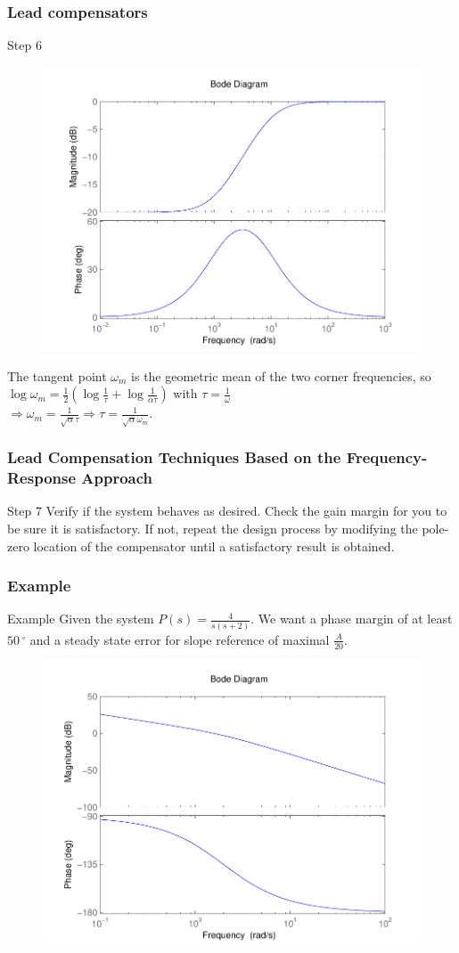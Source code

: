 \begin{frame}
	\frametitle{Lead compensators}
	\begin{block}{Step 6}
		\begin{figure}
			\centering
			\includegraphics[width=0.5
			\linewidth]{bodelead}
		\end{figure}
		The tangent point $\omega_m$ is the geometric mean of the two corner frequencies, so
		$ \log \omega_m = \frac{1}{2}(\log \frac{1}{\tau} + \log \frac{1}{\alpha\tau})$ with $\tau = \frac{1}{\omega}$
		\\ $\Rightarrow \omega_m = \frac{1}{\sqrt{\alpha}\tau} \Rightarrow \tau = \frac{1}{\sqrt{\alpha}\omega_m}$. 
	\end{block}
\end{frame}

\begin{frame}
	\frametitle{Lead Compensation Techniques Based on the Frequency-Response Approach}
	\begin{block}{Step 7}
		Verify if the system behaves as desired.
		Check the gain margin for you to be sure it is satisfactory. If not, repeat the design process
		by modifying the pole-zero location of the compensator until a satisfactory result
		is obtained.
	\end{block}
\end{frame}

\begin{frame}
\frametitle{Example}
\begin{block}{Example}
	Given the system $P(s) = \frac{4}{s(s+2)}$. We want a phase margin of at least $50\,^{\circ}$ and a steady state error for slope reference of maximal $\frac{A}{20}$.
	\begin{figure}
		\centering
		\includegraphics[width=0.5
		\linewidth]{bodeexamplelead}
	\end{figure}
\end{block}
\end{frame}

